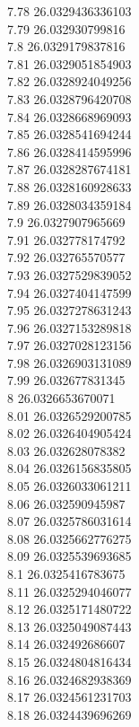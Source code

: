 {7.78	26.0329436336103\\
7.79	26.032930799816\\
7.8	26.0329179837816\\
7.81	26.0329051854903\\
7.82	26.0328924049256\\
7.83	26.0328796420708\\
7.84	26.0328668969093\\
7.85	26.0328541694244\\
7.86	26.0328414595996\\
7.87	26.0328287674181\\
7.88	26.0328160928633\\
7.89	26.0328034359184\\
7.9	26.0327907965669\\
7.91	26.032778174792\\
7.92	26.032765570577\\
7.93	26.0327529839052\\
7.94	26.0327404147599\\
7.95	26.0327278631243\\
7.96	26.0327153289818\\
7.97	26.0327028123156\\
7.98	26.0326903131089\\
7.99	26.032677831345\\
8	26.0326653670071\\
8.01	26.0326529200785\\
8.02	26.0326404905424\\
8.03	26.032628078382\\
8.04	26.0326156835805\\
8.05	26.0326033061211\\
8.06	26.032590945987\\
8.07	26.0325786031614\\
8.08	26.0325662776275\\
8.09	26.0325539693685\\
8.1	26.0325416783675\\
8.11	26.0325294046077\\
8.12	26.0325171480722\\
8.13	26.0325049087443\\
8.14	26.032492686607\\
8.15	26.0324804816434\\
8.16	26.0324682938369\\
8.17	26.0324561231703\\
8.18	26.0324439696269\\
}
